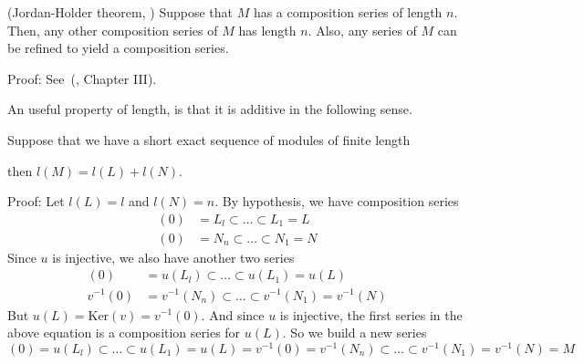 \begin{dang}
    \begin{theorem}(Jordan-Holder theorem, \label{Jordan_Holder_theorem}\cite{erdmann2018algebras})
        Suppose that $M$ has a composition series of length $n$. Then, any other composition series of $M$ has length $n$. Also, any series of $M$ can be refined to yield a composition series.
    \end{theorem}
\end{dang}
Proof: See~(\cite{erdmann2018algebras}, Chapter III).
\par
An useful property of length, is that it is additive in the following sense.
\begin{dang}
    \begin{theorem}\cite{erdmann2018algebras}
        Suppose that we have a short exact sequence of modules of finite length
        \begin{center}
        \end{center}
        then $l(M)=l(L)+l(N)$.
    \end{theorem}
\end{dang}
Proof: Let $l(L)=l$ and $l(N)=n$. By hypothesis, we have composition series
\begin{equation}
    \begin{split}
        (0) &= L_l \subset\dots\subset L_1 = L\\
        (0) &= N_n \subset\dots\subset N_1 = N
    \end{split}
\end{equation}
Since $u$ is injective, we also have another two series
\begin{equation}
\begin{split}
     (0) &= u(L_l) \subset\dots\subset u(L_1) = u(L)  \\
     v^{-1}(0) &= v^{-1}(N_n) \subset\dots\subset v^{-1}(N_1) = v^{-1}(N)
\end{split}    
\end{equation}
But $u(L)=\text{Ker}(v)=v^{-1}(0)$. And since $u$ is injective, the first series in the above equation is a composition series for $u(L)$. So we build a new series
\begin{equation}
     (0) = u(L_l) \subset\dots\subset u(L_1) = u(L)= v^{-1}(0) = v^{-1}(N_n) \subset\dots\subset v^{-1}(N_1) = v^{-1}(N) = M
\end{equation}
